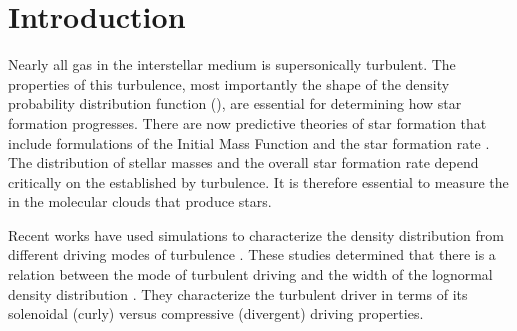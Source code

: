 

\ifstandalone

\fi



\section{Introduction}
Nearly all gas in the interstellar medium is supersonically turbulent.  The
properties of this turbulence, most importantly the shape of the density
probability distribution function (\rhoPDF), are essential for determining how star
formation progresses.
There are now predictive theories of star formation that include formulations
of the Initial Mass Function \citep[IMF;][]{Padoan2002a, Padoan2007a, Chabrier2010a, 
Elmegreen2011a, Hopkins2012b, Hennebelle2013a} and the star
formation rate
\citep[SFR;][]{Krumholz2005c,  Hennebelle2011a,
Padoan2011b, Krumholz2012b, Federrath2012a, Padoan2012a}.
The distribution of stellar masses and the overall star formation rate depend
critically on the \rhoPDF established by turbulence.  It is therefore essential to
measure the \rhoPDF in the molecular clouds that produce stars.

Recent works have used simulations to characterize the density distribution
from different driving modes of turbulence
\citep{Federrath2008a,Federrath2009a,Federrath2010a,Federrath2011a,Price2011b,Federrath2013a}.
These studies determined that there is a relation between the mode of turbulent driving and the width
of the lognormal density distribution
\citep{Padoan2011b,Molina2012a}.
They characterize the turbulent driver in terms of its solenoidal (curly) versus compressive (divergent)
driving properties. 

